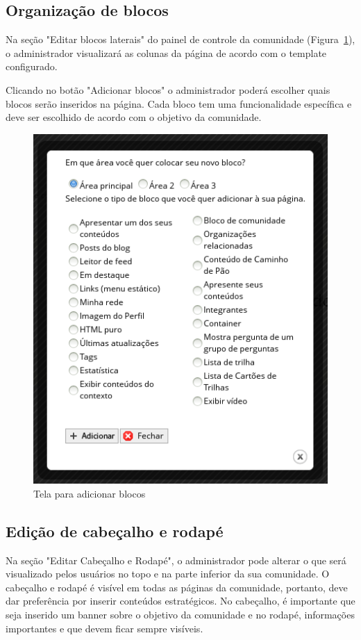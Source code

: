 \documentclass[[a4paper,11pt]{article}
\begin{document}
\subsection{Organização de blocos}

Na seção "Editar blocos laterais" do painel de controle da comunidade 
(Figura~\ref{fig:editar-blocos}), o administrador visualizará as colunas da
página de acordo com o template configurado.

Clicando no botão "Adicionar blocos" o administrador poderá escolher quais
blocos serão inseridos na página. Cada bloco tem uma funcionalidade específica e
deve ser escolhido de acordo com o objetivo da comunidade.

\begin{figure}[h]
\center
\includegraphics[scale=0.5]{editar-blocos.png}
\caption{Tela para adicionar blocos}
\label{fig:editar-blocos}
\end{figure}

\subsection{Edição de cabeçalho e rodapé}

Na seção "Editar Cabeçalho e Rodapé", o administrador pode alterar o que será
visualizado pelos usuários no topo e na parte inferior da sua comunidade. O
cabeçalho e rodapé é visível em todas as páginas da comunidade, portanto, deve
dar preferência por inserir conteúdos estratégicos. No cabeçalho, é
importante que seja inserido um banner sobre o objetivo da comunidade e no
rodapé, informações importantes e que devem ficar sempre visíveis.
\end{document}

